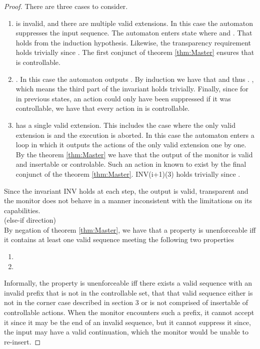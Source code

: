 \documentclass[12pt]{article}
\begin{document}
\begin{proof}
There are three cases to consider.\\
\begin{enumerate}
  \item  is invalid, and there are multiple valid extensions.   In this case the automaton suppresses the input sequence. The automaton enters state  where  and . That   holds from the induction hypothesis. Likewise, the transparency requirement holds trivially since .  The first conjunct of theorem \ref{thm:Master} ensures that  is controllable.

  \item . In this case the automaton outputs . By induction we have that  and thus . , which means the third part of the invariant holds trivially. Finally, since for in previous states, an action could only have been suppressed if it was controllable, we have that every action in  is controllable.

  \item  has a single valid extension. This includes the case where the only valid extension is  and the execution is aborted. In this case the automaton enters a loop in which it outputs the actions of the only valid extension one  by one. By the theorem \ref{thm:Master} we have that the output of the monitor is valid and insertable or controlable. Such an action in known to exist by the final conjunct of the theorem \ref{thm:Master}. INV(i+1)(3) holds trivially since .
\end{enumerate}

Since the invariant INV holds at each step, the output is valid, transparent and the monitor does not behave in a manner inconsistent with the limitations on its capabilities. \\
(else-if direction)\\
By negation of theorem \ref{thm:Master}, we have that a property is unenforceable iff it contains at least one valid sequence  meeting the following two properties \\

\begin{enumerate}
 \item  

 \item 

\end{enumerate}
Informally, the property is unenforceable iff there exists a valid sequence with an invalid prefix that is not in the controllable set, that that valid sequence either is not in the corner case described in section 3 or is not comprised of insertable of controllable actions. When the monitor encounters such a prefix, it cannot accept it since it may be the end of an invalid sequence, but it cannot suppress it since,  the input may have a valid continuation, which the monitor would be unable to re-insert.
\end{proof}
\end{document}

